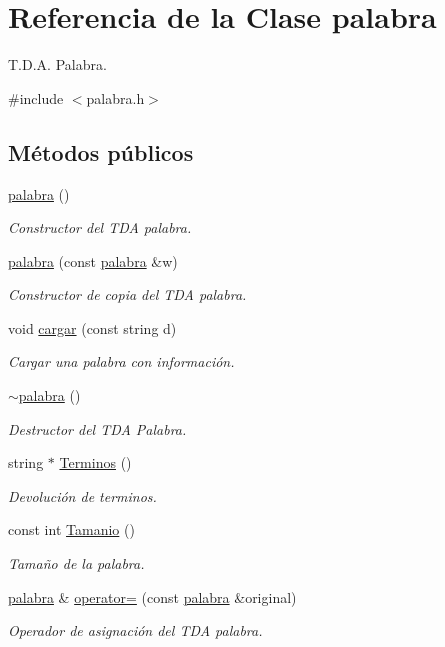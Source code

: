 \hypertarget{classpalabra}{\section{Referencia de la Clase palabra}
\label{classpalabra}
}


T.\-D.\-A. Palabra.  




{\ttfamily \#include $<$palabra.\-h$>$}

\subsection*{Métodos públicos}
\begin{DoxyCompactItemize}
\item 
\hyperlink{classpalabra_aa1f51124f5ada68f41a1579bc9216254}{palabra} ()
\begin{DoxyCompactList}\small\item\em Constructor del T\-D\-A palabra. \end{DoxyCompactList}\item 
\hyperlink{classpalabra_a890abfacbaca2b42bb9f49e3d3182f9a}{palabra} (const \hyperlink{classpalabra}{palabra} \&w)
\begin{DoxyCompactList}\small\item\em Constructor de copia del T\-D\-A palabra. \end{DoxyCompactList}\item 
void \hyperlink{classpalabra_a4ccd489a1acdc6b11f52611562ad4af4}{cargar} (const string d)
\begin{DoxyCompactList}\small\item\em Cargar una palabra con información. \end{DoxyCompactList}\item 
\hyperlink{classpalabra_ae4c8a87d7bfa6cebf5941d4938da661e}{$\sim$palabra} ()
\begin{DoxyCompactList}\small\item\em Destructor del T\-D\-A Palabra. \end{DoxyCompactList}\item 
string $\ast$ \hyperlink{classpalabra_acef4f5bd0630c89975775218daf913bd}{Terminos} ()
\begin{DoxyCompactList}\small\item\em Devolución de terminos. \end{DoxyCompactList}\item 
const int \hyperlink{classpalabra_a9b194a7cce2d3713fa278504f09aca9c}{Tamanio} ()
\begin{DoxyCompactList}\small\item\em Tamaño de la palabra. \end{DoxyCompactList}\item 
\hyperlink{classpalabra}{palabra} \& \hyperlink{classpalabra_a9e54ed0b6c965692b48f72b41dc2a5e7}{operator=} (const \hyperlink{classpalabra}{palabra} \&original)
\begin{DoxyCompactList}\small\item\em Operador de asignación del T\-D\-A palabra. \end{DoxyCompactList}\end{DoxyCompactItemize}


